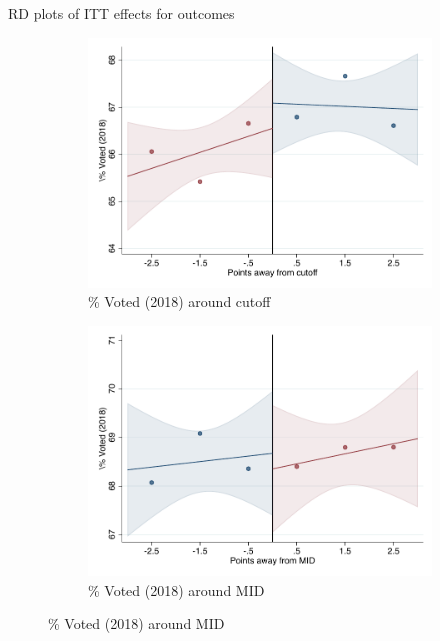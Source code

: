 \documentclass[notes,11pt, aspectratio=169]{beamer}
\begin{document}
\begin{frame}{RD plots of ITT effects for outcomes}
\hyperlink{ITT_rd_plot_IPN}{}
\begin{figure}

    \begin{subfigure}{0.45\textwidth}
        \centering
        \caption{\% Voted (2018) around cutoff}
        \includegraphics[width=\textwidth]{04_Figures/rd_plot_tau_Voto_Marcado_2018_IPN3.pdf}
    \end{subfigure}
    \begin{subfigure}{0.45\textwidth}
        \centering
        \caption{\% Voted (2018) around MID}
        \includegraphics[width=\textwidth]{04_Figures/rd_plot_mid_Voto_Marcado_2018_IPN3.pdf}
    \end{subfigure}
    
\end{figure}
\end{frame}
\end{document}
